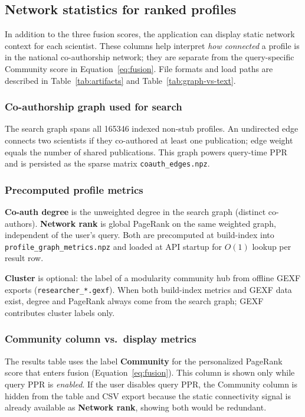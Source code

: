 \documentclass{article}
\begin{document}
\subsection{Network statistics for ranked profiles}
\label{sec:network-stats}

In addition to the three fusion scores, the application can display static network context for each scientist. These columns help interpret \emph{how connected} a profile is in the national co-authorship network; they are separate from the query-specific Community score in Equation~\eqref{eq:fusion}. File formats and load paths are described in Table~\ref{tab:artifacts} and Table~\ref{tab:graph-vs-text}.

\subsubsection{Co-authorship graph used for search}

The search graph spans all \num{165346} indexed non-stub profiles. An undirected edge connects two scientists if they co-authored at least one publication; edge weight equals the number of shared publications. This graph powers query-time PPR and is persisted as the sparse matrix \texttt{coauth\_edges.npz}.

\subsubsection{Precomputed profile metrics}

\textbf{Co-auth degree} is the unweighted degree in the search graph (distinct co-authors). \textbf{Network rank} is global PageRank on the same weighted graph, independent of the user's query. Both are precomputed at build-index into \texttt{profile\_graph\_metrics.npz} and loaded at API startup for $O(1)$ lookup per result row.

\textbf{Cluster} is optional: the label of a modularity community hub from offline GEXF exports (\texttt{researcher\_*.gexf}). When both build-index metrics and GEXF data exist, degree and PageRank always come from the search graph; GEXF contributes cluster labels only.

\subsubsection{Community column vs.\ display metrics}

The results table uses the label \textbf{Community} for the personalized PageRank score that enters fusion (Equation~\eqref{eq:fusion}). This column is shown only while query PPR is \emph{enabled}. If the user disables query PPR, the Community column is hidden from the table and CSV export because the static connectivity signal is already available as \textbf{Network rank}, showing both would be redundant.
\end{document}
